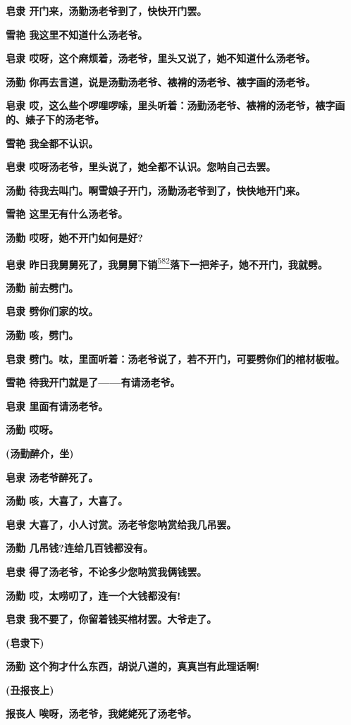 \textbf{皂隶 开门来，汤勤汤老爷到了，快快开门罢。}

\textbf{雪艳 我这里不知道什么汤老爷。}

\textbf{皂隶 哎呀，这个麻烦着，汤老爷，里头又说了，她不知道什么汤老爷。}

\textbf{汤勤 你再去言道，说是汤勤汤老爷、裱褙的汤老爷、裱字画的汤老爷。}

\textbf{皂隶
哎，这么些个啰哩啰嗦，里头听着：汤勤汤老爷、裱褙的汤老爷，裱字画的、婊子下的汤老爷。}

\textbf{雪艳 我全都不认识。}

\textbf{皂隶 哎呀汤老爷，里头说了，她全都不认识。您呐自己去罢。}

\textbf{汤勤 待我去叫门。啊雪娘子开门，汤勤汤老爷到了，快快地开门来。}

\textbf{雪艳 这里无有什么汤老爷。}

\textbf{汤勤 哎呀，她不开门如何是好?}

\textbf{皂隶
昨日我舅舅死了，我舅舅下销}\protect\hyperlink{fn582}{\textsuperscript{582}}\textbf{落下一把斧子，她不开门，我就劈。}

\textbf{汤勤 前去劈门。}

\textbf{皂隶 劈你们家的坟。}

\textbf{汤勤 咳，劈门。}

\textbf{皂隶
劈门。呔，里面听着：汤老爷说了，若不开门，可要劈你们的棺材板啦。}

\textbf{雪艳 待我开门就是了------有请汤老爷。}

\textbf{皂隶 里面有请汤老爷。}

\textbf{汤勤 哎呀。}

\textbf{(汤勤醉介，坐)}

\textbf{皂隶 汤老爷醉死了。}

\textbf{汤勤 咳，大喜了，大喜了。}

\textbf{皂隶 大喜了，小人讨赏。汤老爷您呐赏给我几吊罢。}

\textbf{汤勤 几吊钱?连给几百钱都没有。}

\textbf{皂隶 得了汤老爷，不论多少您呐赏我俩钱罢。}

\textbf{汤勤 哎，太唠叨了，连一个大钱都没有!}

\textbf{皂隶 我不要了，你留着钱买棺材罢。大爷走了。}

\textbf{(皂隶下)}

\textbf{汤勤 这个狗才什么东西，胡说八道的，真真岂有此理话啊!}

\textbf{(丑报丧上)}

\textbf{报丧人 唉呀，汤老爷，我姥姥死了汤老爷。}

